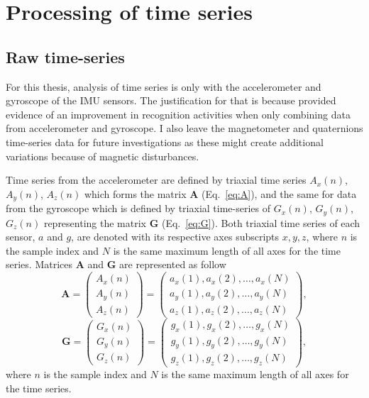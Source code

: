 \section{Processing of time series} \label{sec:preparation_timeseries}

\subsection{Raw time-series}
For this thesis, analysis of time series is only with the accelerometer 
and gyroscope of the IMU sensors.
The justification for that is because \cite{shoaib2016} provided evidence 
of an improvement in recognition activities when only combining data 
from accelerometer and gyroscope. 
I also leave the magnetometer and quaternions time-series data for 
future investigations as these might create additional variations 
because of magnetic disturbances.

Time series from the accelerometer are defined by triaxial time series 
$A_x(n)$, $A_y(n)$, $A_z(n)$ which forms the matrix $\boldsymbol{A}$ 
(Eq.~\ref{eq:A}), and the same for data from the gyroscope which is 
defined by triaxial time-series of $G_x(n)$, $G_y(n)$, $G_z(n)$ representing 
the matrix $\boldsymbol{G}$ (Eq.~\ref{eq:G}). Both triaxial time series of 
each sensor, $a$ and $g$, are denoted with its respective axes 
subscripts $x,y,z$, where $n$ is the sample index and $N$ is the same 
maximum length of all axes for the time series.
Matrices $\boldsymbol{A}$ and $\boldsymbol{G}$ are represented as follow
\begin{equation}\label{eq:A}
\boldsymbol{A} =
\begin{pmatrix}
  A_x(n) \\
  A_y(n) \\
  A_z(n)
\end{pmatrix}
=
\begin{pmatrix}
 a_x(1),a_x(2),\dots,a_x(N) \\
 a_y(1),a_y(2),\dots,a_y(N) \\
 a_z(1),a_z(2),\dots,a_z(N) 
\end{pmatrix},
\end{equation}
\begin{equation}\label{eq:G}
\boldsymbol{G} =
\begin{pmatrix}
 G_x(n) \\
 G_y(n) \\
 G_z(n)
\end{pmatrix}
=
\begin{pmatrix}
 g_x(1),g_x(2),\dots,g_x(N) \\
 g_y(1),g_y(2),\dots,g_y(N) \\
 g_z(1),g_z(2),\dots,g_z(N) 
\end{pmatrix},
\end{equation}
where $n$ is the sample index and $N$ is the same maximum length of all axes 
for the time series.


